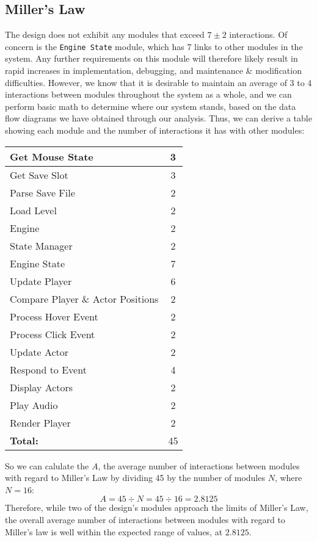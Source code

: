 \documentclass{article}
\begin{document}
	\subsection{Miller's Law}
		The design does not exhibit any modules that exceed $7\pm2$ interactions. Of concern is the \texttt{Engine State} module, which has 7 links to other modules in the system. Any further requirements on this module will therefore likely result in rapid increases in implementation, debugging, and maintenance \& modification difficulties. However, we know that it is desirable to maintain an average of 3 to 4 interactions between modules throughout the system as a whole, and we can perform basic math to determine where our system stands, based on the data flow diagrams we have obtained through our analysis. Thus, we can derive a table showing each module and the number of interactions it has with other modules:
		\begin{center}
			\begin{tabular}{| l || c |}
				\hline
				Get Mouse State 					& 3 \\ \hline
				Get Save Slot 						& 3 \\ \hline
				Parse Save File 					& 2 \\ \hline
				Load Level							& 2 \\ \hline
				Engine								& 2 \\ \hline
				State Manager 						& 2 \\ \hline
				Engine State						& 7 \\ \hline
				Update Player						& 6 \\ \hline
				Compare Player \& Actor Positions	& 2 \\ \hline
				Process Hover Event					& 2 \\ \hline
				Process Click Event					& 2	\\ \hline
				Update Actor						& 2 \\ \hline
				Respond to Event					& 4 \\ \hline
				Display Actors						& 2 \\ \hline
				Play Audio							& 2 \\ \hline
				Render Player						& 2 \\ \hline
				\textbf{Total:}						& 45 \\
				\hline
			\end{tabular}
		\end{center}
		So we can calulate the $A$, the average number of interactions between modules with regard to Miller's Law by dividing 45 by the number of modules $N$, where $N = 16$: 
		$$A = 45 \div N = 45 \div 16 = 2.8125$$
		Therefore, while two of the design's modules approach the limits of Miller's Law, the overall average number of interactions between modules with regard to Miller's law is well within the expected range of values, at $2.8125$. 
\end{document}
